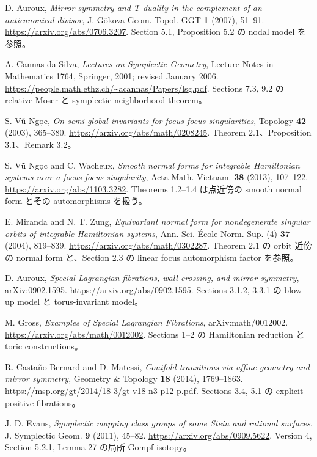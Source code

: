 D. Auroux,
\emph{Mirror symmetry and T-duality in the complement of an anticanonical divisor},
J. G\"okova Geom. Topol. GGT \textbf{1} (2007), 51--91.
\url{https://arxiv.org/abs/0706.3207}.
Section 5.1, Proposition 5.2 の nodal model を参照。

A. Cannas da Silva,
\emph{Lectures on Symplectic Geometry}, Lecture Notes in Mathematics 1764, Springer, 2001;
revised January 2006.
\url{https://people.math.ethz.ch/~acannas/Papers/lsg.pdf}.
Sections 7.3, 9.2 の relative Moser と symplectic neighborhood theorem。

S. V\~u Ng\d{o}c,
\emph{On semi-global invariants for focus-focus singularities},
Topology \textbf{42} (2003), 365--380.
\url{https://arxiv.org/abs/math/0208245}.
Theorem 2.1、Proposition 3.1、Remark 3.2。

S. V\~u Ng\d{o}c and C. Wacheux,
\emph{Smooth normal forms for integrable Hamiltonian systems near a focus-focus singularity},
Acta Math. Vietnam. \textbf{38} (2013), 107--122.
\url{https://arxiv.org/abs/1103.3282}.
Theorems 1.2--1.4 は点近傍の smooth normal form とその automorphisms を扱う。

E. Miranda and N. T. Zung,
\emph{Equivariant normal form for nondegenerate singular orbits of integrable Hamiltonian systems},
Ann. Sci. \'Ecole Norm. Sup. (4) \textbf{37} (2004), 819--839.
\url{https://arxiv.org/abs/math/0302287}.
Theorem 2.1 の orbit 近傍の normal form と、Section 2.3 の linear focus automorphism factor を参照。

D. Auroux,
\emph{Special Lagrangian fibrations, wall-crossing, and mirror symmetry},
arXiv:0902.1595.
\url{https://arxiv.org/abs/0902.1595}.
Sections 3.1.2, 3.3.1 の blow-up model と torus-invariant model。

M. Gross,
\emph{Examples of Special Lagrangian Fibrations},
arXiv:math/0012002.
\url{https://arxiv.org/abs/math/0012002}.
Sections 1--2 の Hamiltonian reduction と toric constructions。

R. Casta\~no-Bernard and D. Matessi,
\emph{Conifold transitions via affine geometry and mirror symmetry},
Geometry \& Topology \textbf{18} (2014), 1769--1863.
\url{https://msp.org/gt/2014/18-3/gt-v18-n3-p12-p.pdf}.
Sections 3.4, 5.1 の explicit positive fibrations。

J. D. Evans,
\emph{Symplectic mapping class groups of some Stein and rational surfaces},
J. Symplectic Geom. \textbf{9} (2011), 45--82.
\url{https://arxiv.org/abs/0909.5622}.
Version 4, Section 5.2.1, Lemma 27 の局所 Gompf isotopy。

